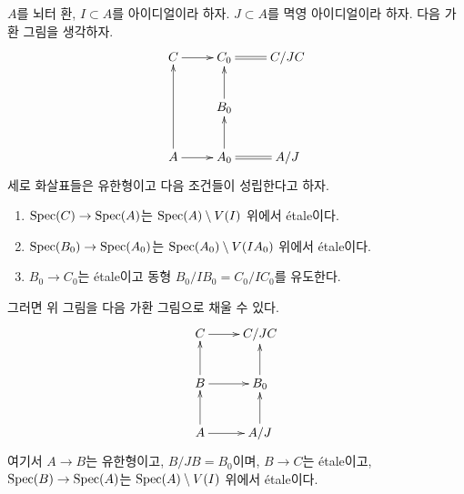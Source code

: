 \begin{lemma}
\label{lemma-lift-approximation}
$A$를 뇌터 환, $I \subset A$를 아이디얼이라 하자.
$J \subset A$를 멱영 아이디얼이라 하자. 다음 가환 그림을 생각하자.
$$
\xymatrix{
C \ar[r] & C_0 \ar@{=}[r] & C/JC \\
& B_0 \ar[u] \\
A \ar[r] \ar[uu] & A_0 \ar[u] \ar@{=}[r] & A/J
}
$$
세로 화살표들은 유한형이고 다음 조건들이 성립한다고 하자.
\begin{enumerate}
\item $\mathop{\mathrm{Spec}}(C) \to \mathop{\mathrm{Spec}}(A)$는 $\mathop{\mathrm{Spec}}(A) \setminus V(I)$ 위에서 \'etale이다.
\item $\mathop{\mathrm{Spec}}(B_0) \to \mathop{\mathrm{Spec}}(A_0)$는
$\mathop{\mathrm{Spec}}(A_0) \setminus V(IA_0)$ 위에서 \'etale이다.
\item $B_0 \to C_0$는 \'etale이고 동형
$B_0/IB_0 = C_0/IC_0$를 유도한다.
\end{enumerate}
그러면 위 그림을 다음 가환 그림으로 채울 수 있다.
$$
\xymatrix{
C \ar[r] & C/JC \\
B \ar[u] \ar[r] & B_0 \ar[u] \\
A \ar[r] \ar[u] & A/J \ar[u]
}
$$
여기서 $A \to B$는 유한형이고, $B/JB = B_0$이며,
$B \to C$는 \'etale이고, $\mathop{\mathrm{Spec}}(B) \to \mathop{\mathrm{Spec}}(A)$는
$\mathop{\mathrm{Spec}}(A) \setminus V(I)$ 위에서 \'etale이다.
\end{lemma}

